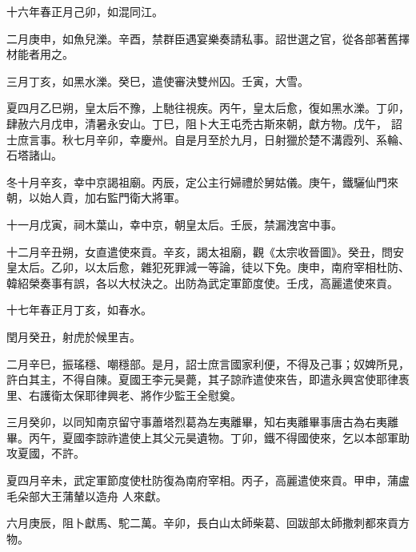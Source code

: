 
\begin{pinyinscope}

 十六年春正月己卯，如混同江。



 二月庚申，如魚兒濼。辛酉，禁群臣遇宴樂奏請私事。詔世選之官，從各部著舊擇材能者用之。



 三月丁亥，如黑水濼。癸巳，遣使審決雙州囚。壬寅，大雪。



 夏四月乙巳朔，皇太后不豫，上馳往視疾。丙午，皇太后愈，復如黑水濼。丁卯，肆赦六月戊申，清暑永安山。丁巳，阻卜大王屯禿古斯來朝，獻方物。戊午，
 詔士庶言事。秋七月辛卯，幸慶州。自是月至於九月，日射獵於楚不溝霞列、系輪、石塔諸山。



 冬十月辛亥，幸中京謁祖廟。丙辰，定公主行婦禮於舅姑儀。庚午，鐵驪仙門來朝，以始人貢，加右監門衛大將軍。



 十一月戊寅，祠木葉山，幸中京，朝皇太后。壬辰，禁漏洩宮中事。



 十二月辛丑朔，女直遣使來貢。辛亥，謁太祖廟，觀《太宗收晉圖》。癸丑，問安皇太后。乙卯，以太后愈，雜犯死罪減一等論，徒以下免。庚申，南府宰相杜防、韓紹榮奏事有誤，各以大杖決之。出防為武定軍節度使。壬戌，高麗遣使來貢。



 十七年春正月丁亥，如春水。



 閏月癸丑，射虎於候里吉。



 二月辛巳，振瑤穩、嘲穩部。是月，詔士庶言國家利便，不得及己事；奴婢所見，許白其主，不得自陳。夏國王李元昊薨，其子諒祚遣使來告，即遣永興宮使耶律褭里、右護衛太保耶律興老、將作少監王全慰奠。



 三月癸卯，以同知南京留守事蕭塔烈葛為左夷離畢，知右夷離畢事唐古為右夷離畢。丙午，夏國李諒祚遣使上其父元昊遺物。丁卯，鐵不得國使來，乞以本部軍助攻夏國，不許。



 夏四月辛未，武定軍節度使杜防復為南府宰相。丙子，高麗遣使來貢。甲申，蒲盧毛朵部大王蒲輦以造舟
 人來獻。



 六月庚辰，阻卜獻馬、駝二萬。辛卯，長白山太師柴葛、回跋部太師撒刺都來貢方物。




\end{pinyinscope}
